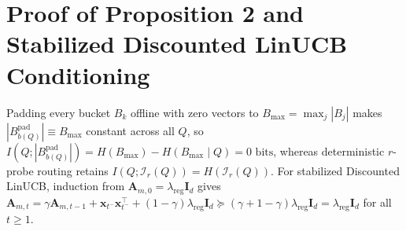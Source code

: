 \documentclass[10pt,journal,compsoc]{IEEEtran}
\begin{document}
\section{Proof of Proposition 2 and Stabilized Discounted LinUCB Conditioning}
Padding every bucket $B_k$ offline with zero vectors to $B_{\max} = \max_j |B_j|$ makes $|B_{b(Q)}^{\text{pad}}| \equiv B_{\max}$ constant across all $Q$, so $I(Q; |B_{b(Q)}^{\text{pad}}|) = H(B_{\max}) - H(B_{\max}\mid Q) = 0\text{ bits}$, whereas deterministic $r$-probe routing retains $I(Q; \mathcal{I}_r(Q)) = H(\mathcal{I}_r(Q))$. For stabilized Discounted LinUCB, induction from $\mathbf{A}_{m,0} = \lambda_{\text{reg}}\mathbf{I}_d$ gives $\mathbf{A}_{m,t} = \gamma\mathbf{A}_{m,t-1} + \mathbf{x}_{t^-}\mathbf{x}_{t^-}^\top + (1-\gamma)\lambda_{\text{reg}}\mathbf{I}_d \succeq (\gamma + 1 - \gamma)\lambda_{\text{reg}}\mathbf{I}_d = \lambda_{\text{reg}}\mathbf{I}_d$ for all $t \ge 1$.
\end{document}
